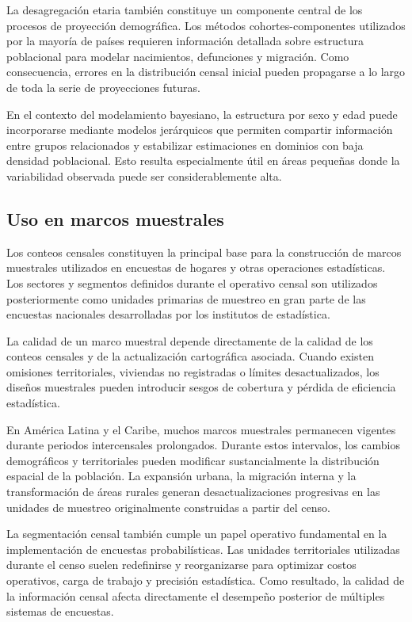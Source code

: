 \documentclass[
  spanish,
]{book}
\begin{document}
La desagregación etaria también constituye un componente central de los procesos de proyección demográfica. Los métodos cohortes-componentes utilizados por la mayoría de países requieren información detallada sobre estructura poblacional para modelar nacimientos, defunciones y migración. Como consecuencia, errores en la distribución censal inicial pueden propagarse a lo largo de toda la serie de proyecciones futuras.

En el contexto del modelamiento bayesiano, la estructura por sexo y edad puede incorporarse mediante modelos jerárquicos que permiten compartir información entre grupos relacionados y estabilizar estimaciones en dominios con baja densidad poblacional. Esto resulta especialmente útil en áreas pequeñas donde la variabilidad observada puede ser considerablemente alta.

\subsection{Uso en marcos muestrales}\label{uso-en-marcos-muestrales}

Los conteos censales constituyen la principal base para la construcción de marcos muestrales utilizados en encuestas de hogares y otras operaciones estadísticas. Los sectores y segmentos definidos durante el operativo censal son utilizados posteriormente como unidades primarias de muestreo en gran parte de las encuestas nacionales desarrolladas por los institutos de estadística.

La calidad de un marco muestral depende directamente de la calidad de los conteos censales y de la actualización cartográfica asociada. Cuando existen omisiones territoriales, viviendas no registradas o límites desactualizados, los diseños muestrales pueden introducir sesgos de cobertura y pérdida de eficiencia estadística.

En América Latina y el Caribe, muchos marcos muestrales permanecen vigentes durante periodos intercensales prolongados. Durante estos intervalos, los cambios demográficos y territoriales pueden modificar sustancialmente la distribución espacial de la población. La expansión urbana, la migración interna y la transformación de áreas rurales generan desactualizaciones progresivas en las unidades de muestreo originalmente construidas a partir del censo.

La segmentación censal también cumple un papel operativo fundamental en la implementación de encuestas probabilísticas. Las unidades territoriales utilizadas durante el censo suelen redefinirse y reorganizarse para optimizar costos operativos, carga de trabajo y precisión estadística. Como resultado, la calidad de la información censal afecta directamente el desempeño posterior de múltiples sistemas de encuestas.
\end{document}
